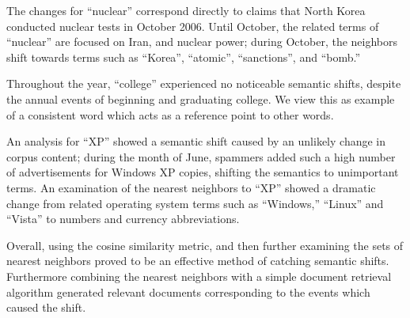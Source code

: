 \documentclass[a4paper,twocolumn,twoside,10pt]{ranlp}
\begin{document}
The changes for ``nuclear'' correspond directly to claims that North Korea
conducted nuclear tests in October 2006.  Until October, the related terms of
``nuclear'' are focused on Iran, and nuclear power; during
October, the neighbors shift towards terms such as ``Korea'', ``atomic'',
``sanctions'', and ``bomb.''  

Throughout the year, ``college'' experienced no noticeable semantic shifts,
despite the annual events of beginning and graduating college.  We view this as
example of a consistent word which acts as a reference point to other words.

An analysis for ``XP'' showed a semantic shift caused by an unlikely change in
corpus content; during the month of June, spammers added such a high number of
advertisements for Windows XP copies, shifting the semantics to unimportant
terms.  An examination of the nearest neighbors to ``XP'' showed a dramatic
change from related operating system terms such as ``Windows,'' ``Linux'' and
``Vista'' to numbers and currency abbreviations.

Overall, using the cosine similarity metric, and then further examining the sets
of nearest neighbors proved to be an effective method of catching semantic
shifts.  Furthermore combining the nearest neighbors with a simple document
retrieval algorithm generated relevant documents corresponding to the events
which caused the shift.
\end{document}
